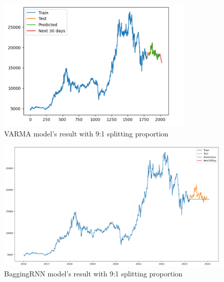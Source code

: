 \documentclass{ieeeojies}
\begin{document}
\begin{figure}[H]
  \centering
  \begin{minipage}{0.8\linewidth}
    \centering
    \includegraphics[width=\linewidth]{bibliography/GRU_MBB91.png}
    \caption{VARMA model's result with 9:1 splitting proportion}
    \label{fig17}
  \end{minipage}
\end{figure}
\begin{figure}[H]
  \centering
  \begin{minipage}{0.8\linewidth}
    \centering
    \includegraphics[width=\linewidth]{bibliography/ARIMA_MBB91.png}
    \caption{BaggingRNN model's result with 9:1 splitting proportion}
    \label{fig18}
  \end{minipage}
\end{figure}
\end{document}
